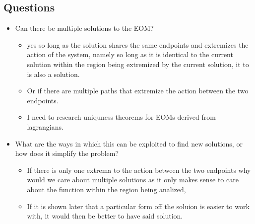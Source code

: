 \subsection*{Questions}
\begin{itemize}
    \item[Question:] Can there be multiple solutions to the EOM?
    \begin{itemize}
        \item[Thought:] yes so long as the solution shares the same endpoints and extremizes the action of the system, namely so long as it is identical to the current solution within the region being extremized by the current solution, it to is also a solution.  
        \item[Thought:] Or if there are multiple paths that extremize the action between the two endpoints.
        \item[Study:] I need to research uniquness theorems for EOMs derived from lagrangians.  
    \end{itemize}
    \item[Question:]What are the ways in which this can be exploited to find new solutions, or how does it simplify the problem?
    \begin{itemize}
        \item[Thought:] If there is only one extrema to the action between the two endpoints why would we care about multiple solutions as it only makes sense to care about the function within the region being analized, 
        \item[Thought:] If it is shown later that a particular form off the soluion is easier to work with, it would then be better to have said solution.
    \end{itemize}
\end{itemize}